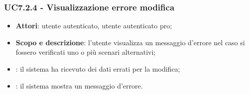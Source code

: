 	\subsubsection{UC7.2.4 - Visualizzazione errore modifica}
	\begin{itemize}
		\item
			\textbf{Attori}: utente autenticato, utente autenticato pro;
		\item
			\textbf{Scopo e descrizione}: l'utente visualizza un messaggio d'errore nel caso si fossero verificati uno o più scenari alternativi;
		\item		
			: il sistema ha ricevuto dei dati errati per la modifica;
		\item
			: il sistema mostra un messaggio d'errore.
	\end{itemize}	
	
